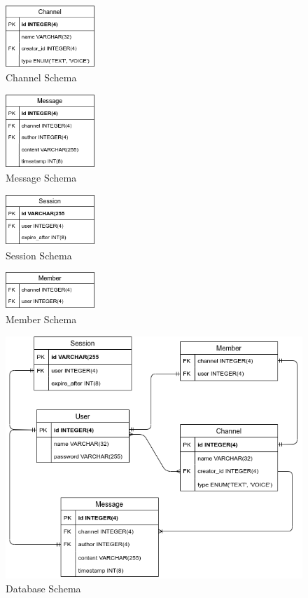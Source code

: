 \begin{figure}[h!]
    \caption{Channel Schema}
    \label{image:channelSchema}
    \centering
    \includegraphics[width=0.3\textwidth]{images/ChannelSchema.png}
\end{figure}

\begin{figure}[h!]
    \caption{Message Schema}
    \label{image:messageSchema}
    \centering
    \includegraphics[width=0.3\textwidth]{images/MessageSchema.png}
\end{figure}

\begin{figure}[h!]
    \caption{Session Schema}
    \label{image:sessionSchema}
    \centering
    \includegraphics[width=0.3\textwidth]{images/SessionSchema.png}
\end{figure}

\begin{figure}[h!]
    \caption{Member Schema}
    \label{image:memberSchema}
    \centering
    \includegraphics[width=0.3\textwidth]{images/MemberSchema.png}
\end{figure}

\begin{figure}[h!]
    \caption{Database Schema}
    \label{image:databaseSchema}
    \centering
    \includegraphics[width=1\textwidth]{images/FullSchemaDesign.png}
\end{figure}
